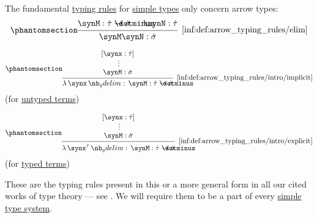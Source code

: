 \begin{definition}\label{def:arrow_typing_rules}
  The fundamental \hyperref[def:type_derivation_tree]{typing rules} for \hyperref[def:simple_type]{simple types} only concern arrow types:
  \begin{equation*}\taglabel[\ensuremath{ \rightarrow_- }]{inf:def:arrow_typing_rules/elim}
    \begin{prooftree}
      \hypo{ \synM: \syn\tau \synimplies \syn\sigma }
      \hypo{ \synN: \syn\tau }
      \infer2[\ref{inf:def:arrow_typing_rules/elim}]{ \synM \synN: \syn\sigma }
    \end{prooftree}
  \end{equation*}

  \begin{paracol}{2}
    \begin{leftcolumn}
      \centering
      \ParacolAlignmentHack
      \begin{equation*}\taglabel[\ensuremath{ \rightarrow_+ }]{inf:def:arrow_typing_rules/intro/implicit}
        \begin{prooftree}
          \hypo{ [\synx: \syn\tau] }
          \ellipsis {} { \synM: \syn\sigma }
          \infer1[\ref{inf:def:arrow_typing_rules/intro/implicit}]{ \qabs \synx \synM: \syn\tau \synimplies \syn\sigma }
        \end{prooftree}
      \end{equation*}
      (for \hyperref[def:lambda_term]{untyped terms})\phantom{\( \rightarrow_+ \)}
    \end{leftcolumn}

    \begin{rightcolumn}
      \centering
      \ParacolAlignmentHack
      \begin{equation*}\taglabel[\ensuremath{ \rightarrow_+^{\T{tt}} }]{inf:def:arrow_typing_rules/intro/explicit}
        \begin{prooftree}
          \hypo{ [\synx: \syn\tau] }
          \ellipsis {} { \synM: \syn\sigma }
          \infer1[\ref{inf:def:arrow_typing_rules/intro/explicit}]{ \qabs {\synx^{\syn\tau}} \synM: \syn\tau \synimplies \syn\sigma }
        \end{prooftree}
      \end{equation*}
      (for \hyperref[def:typed_lambda_term]{typed terms})
    \end{rightcolumn}
  \end{paracol}
\end{definition}
\begin{comments}
  \item These are the typing rules present in this or a more general form in all our cited works of type theory --- see . We will require them to be a part of every \hyperref[def:simple_type_system]{simple type system}.
\end{comments}

